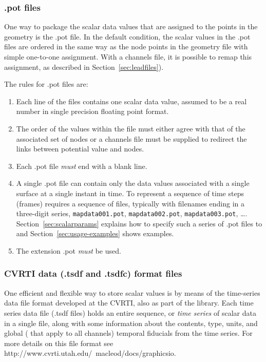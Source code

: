 \subsubsection{.pot files}
\label{sec:potfiles} 

One way to package the scalar data values that are assigned to the points
in the geometry is the .pot file.  In the default condition,
the scalar values in the .pot files are ordered in the same way as
the node points in the geometry file with simple one-to-one assignment.
With a channels file, it is possible to remap this assignment, as described
in Section~\ref{sec:leadfiles}).

\noindent
The rules for .pot files are:
%
\begin{enumerate}
  \item Each line of the files contains one scalar data value, assumed to
        be a real number in single precision floating point format. 
  \item The order of the values within the file must either agree with that
        of the associated set of nodes or a channels file must be supplied
        to redirect the links between potential value and nodes.
  \item Each .pot file {\em must\/} end with a blank line.
  \item A single .pot file can contain only the data values
        associated with a single surface at a single instant in time.  To
        represent a sequence of time steps (frames) requires a sequence of
        files, typically with filenames ending in a three-digit series,
        \eg{} \texttt{mapdata001.pot}, \texttt{mapdata002.pot},
        \texttt{mapdata003.pot}, \ldots{}.  Section~\ref{sec:scalarparams}
        explains how to specify such a series of .pot files to \map{} and
        Section~\ref{sec:usage-examples} shows examples.
  \item The extension .pot {\em must\/} be used.
\end{enumerate}


\subsubsection{CVRTI data (.tsdf and .tsdfc) format files}
\label{sec:tsdffile} 

One efficient and flexible way to store scalar values is by means of the
time-series data file format developed at the CVRTI, also as part of the
\graphicsio{} library.  Each time series data file (.tsdf files) holds an
entire sequence, or \emph{time series} of scalar data in a single file,
along with some information about the contents, type, units, and global
(\ie{} that apply to all channels) temporal fiducials from the time series.
For more details on this file format see
{http://www.cvrti.utah.edu/~macleod/docs/graphicsio}.

